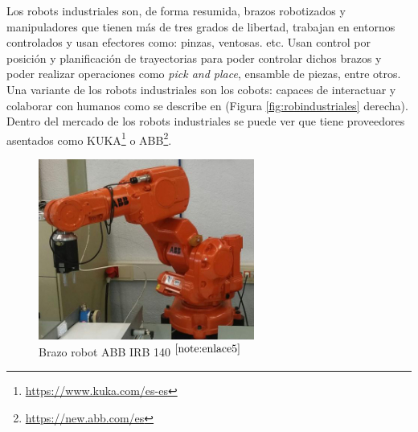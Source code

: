 Los robots industriales son, de forma resumida, brazos robotizados y manipuladores que tienen más de tres grados de libertad, trabajan en entornos controlados y usan efectores como: pinzas, ventosas. etc. Usan control por posición y planificación de trayectorias para poder controlar dichos brazos y poder realizar operaciones como \textit{pick and place}, ensamble de piezas, entre otros. Una variante de los robots industriales son los cobots: capaces de interactuar y colaborar con humanos como se describe en  \cite{ELZAATARI2019162} (Figura \ref{fig:robindustriales} derecha). Dentro del mercado de los robots industriales se puede ver que tiene proveedores asentados como \acs{KUKA}\footnote{\url{https://www.kuka.com/es-es}} o \acs{ABB}\footnote{\url{https://new.abb.com/es}}.

\begin{figure}[ht!]
	\centering
	\begin{minipage}{0.44\linewidth}
		\centering
		\includegraphics[width=\linewidth]{figs/brazoIRB140.png}
		\caption*{\centering Brazo robot ABB IRB 140 $^{\ref{note:enlace5}}$}


\end{minipage}
\end{figure}
